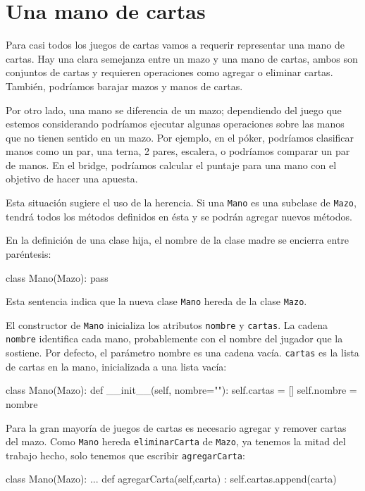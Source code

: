 \section{Una mano de cartas}

Para casi todos los juegos de cartas vamos a requerir representar
una mano de cartas. Hay una clara semejanza entre un mazo y una mano
de cartas, ambos son conjuntos de cartas y requieren operaciones como
agregar o eliminar cartas. También, podríamos barajar mazos y manos
de cartas.

Por otro lado, una mano se diferencia de un mazo; dependiendo del
juego que estemos considerando podríamos ejecutar algunas operaciones
sobre las manos que no tienen sentido en un mazo. Por ejemplo, en
el póker, podríamos clasificar manos como un par, una terna, 2 pares,
escalera, o podríamos comparar un par de manos. En el bridge, podríamos
calcular el puntaje para una mano con el objetivo de hacer una apuesta.

Esta situación sugiere el uso de la herencia. Si una \texttt{Mano}
es una subclase de \texttt{Mazo}, tendrá todos los métodos definidos
en ésta y se podrán agregar nuevos métodos.

 

En la definición de una clase hija, el nombre de la clase madre se
encierra entre paréntesis:

\begin{pythoncode}
class Mano(Mazo):
  pass
\end{pythoncode}
 Esta sentencia indica que la nueva clase \texttt{Mano} hereda de
la clase \texttt{Mazo}.

El constructor de \texttt{Mano} inicializa los atributos \texttt{nombre}
y \texttt{cartas}. La cadena \texttt{nombre} identifica cada mano,
probablemente con el nombre del jugador que la sostiene. Por defecto,
el parámetro nombre es una cadena vacía. \texttt{cartas} es la lista
de cartas en la mano, inicializada a una lista vacía:

\begin{pythoncode}
class Mano(Mazo):
  def __init__(self, nombre=""):
    self.cartas = []
    self.nombre = nombre
\end{pythoncode}
 Para la gran mayoría de juegos de cartas es necesario agregar y remover
cartas del mazo. Como \texttt{Mano} hereda \texttt{eliminarCarta}
de \texttt{Mazo}, ya tenemos la mitad del trabajo hecho, solo tenemos
que escribir \texttt{agregarCarta}:
\begin{pythoncode}
class Mano(Mazo):
  ...
  def agregarCarta(self,carta) :
    self.cartas.append(carta)
\end{pythoncode}

